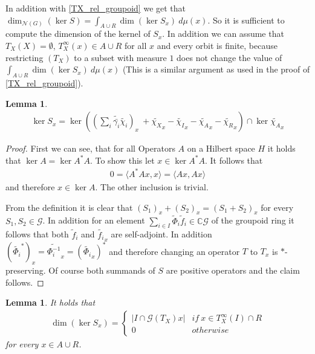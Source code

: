 \documentclass[12pt,a4paper]{scrartcl}
\theoremstyle{plain}
\newtheorem{Lemma}[Theorem]{Lemma}
\theoremstyle{definition}
\numberwithin{equation}{section}
\newcommand{\C}{\mathbb{C}} %
\newcommand{\2}{\mathbb{Z} / 2 \mathbb{Z}}
\newcommand{\G}{\mathcal{G}}
\newcommand{\1}{\bar{1}}
\newcommand{\0}{\bar{0}}
\begin{document}
In addition with \ref{TX_rel_groupoid} we get that $\dim_{\mathcal{N}(G)}(\ker S) = \int_{A \cup R} \dim (\ker S_x) \ d \mu (x)$. So it is sufficient to compute the dimension of the kernel of $S_x$. In addition we can assume that $T_X(X) = \emptyset$, $T_X^\infty(x) \in A \cup R$ for all $x$ and every orbit is finite, because restricting $(T_X)$ to a subset with measure $1$ does not change the value of $\int_{A \cup R} \dim (\ker S_x) \ d \mu (x)$ (This is a similar argument as used in the proof of \ref{TX_rel_groupoid}).
\begin{Lemma}
	\begin{align*}
	\ker S_x = \ker((\sum_{i} \tilde{\bar{\gamma_i}} \tilde{\chi_i})_x \ + \tilde{\chi_X}_x - \tilde{\chi_I}_x - \tilde{\chi_A}_x - \tilde{\chi_R}_x) \cap \ker \tilde{\chi_A}_x
	\end{align*}
\end{Lemma}
\begin{proof}
	First we can see, that for all Operators $A$ on a Hilbert space $H$ it holds that $\ker A = \ker A^*A$. To show this let $x \in \ker A^*A$. It follows that
	\begin{align*}
		0 = \langle A^*Ax, x \rangle = \langle Ax, Ax \rangle
	\end{align*}
	and therefore $x \in \ker A$. The other inclusion is trivial. 
	
	From the definition it is clear that $(S_1)_x + (S_2)_x = (S_1 + S_2)_x$ for every $S_1, S_2 \in \G$. In addition for an element $\sum_{i \in I} \tilde \Phi_i\tilde f_i \in \C\G$ of the  groupoid ring it follows that both $\tilde f_i$ and $\tilde {f_i}_x$ are self-adjoint. In addition $(\widetilde {\Phi_i}^*)_x = \widetilde {\Phi_i^{-1}}_x = (\widetilde {\Phi_i}_x)^*$  and therefore changing an operator $T$ to $T_x$ is $*$-preserving. Of course both summands of $S$ are positive operators and the claim follows.
\end{proof}
\begin{Lemma} \label{kerSx_berechnen}
	It holds that
	\begin{align*}
		\dim (\ker S_x) = \begin{cases}
		|I \cap \G (T_X)x| & if \ x \in T_X^\infty(I) \cap R\\
		0 & otherwise 
		\end{cases}
	\end{align*}
	for every $x \in A \cup R$.
\end{Lemma}
\end{document}

